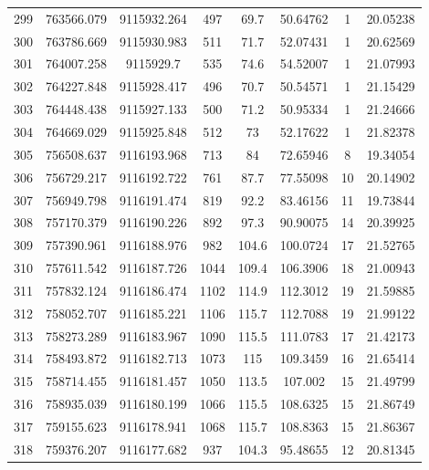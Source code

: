 \begin{longtable}{cccccccc}
299  & 763566.079      & 9115932.264      & 497     & 69.7  & 50.64762 & 1  & 20.05238 \\
300  & 763786.669      & 9115930.983      & 511     & 71.7  & 52.07431 & 1  & 20.62569 \\
301  & 764007.258      & 9115929.7        & 535     & 74.6  & 54.52007 & 1  & 21.07993 \\
302  & 764227.848      & 9115928.417      & 496     & 70.7  & 50.54571 & 1  & 21.15429 \\
303  & 764448.438      & 9115927.133      & 500     & 71.2  & 50.95334 & 1  & 21.24666 \\
304  & 764669.029      & 9115925.848      & 512     & 73    & 52.17622 & 1  & 21.82378 \\
305  & 756508.637      & 9116193.968      & 713     & 84    & 72.65946 & 8  & 19.34054 \\
306  & 756729.217      & 9116192.722      & 761     & 87.7  & 77.55098 & 10 & 20.14902 \\
307  & 756949.798      & 9116191.474      & 819     & 92.2  & 83.46156 & 11 & 19.73844 \\
308  & 757170.379      & 9116190.226      & 892     & 97.3  & 90.90075 & 14 & 20.39925 \\
309  & 757390.961      & 9116188.976      & 982     & 104.6 & 100.0724 & 17 & 21.52765 \\
310  & 757611.542      & 9116187.726      & 1044    & 109.4 & 106.3906 & 18 & 21.00943 \\
311  & 757832.124      & 9116186.474      & 1102    & 114.9 & 112.3012 & 19 & 21.59885 \\
312  & 758052.707      & 9116185.221      & 1106    & 115.7 & 112.7088 & 19 & 21.99122 \\
313  & 758273.289      & 9116183.967      & 1090    & 115.5 & 111.0783 & 17 & 21.42173 \\
314  & 758493.872      & 9116182.713      & 1073    & 115   & 109.3459 & 16 & 21.65414 \\
315  & 758714.455      & 9116181.457      & 1050    & 113.5 & 107.002  & 15 & 21.49799 \\
316  & 758935.039      & 9116180.199      & 1066    & 115.5 & 108.6325 & 15 & 21.86749 \\
317  & 759155.623      & 9116178.941      & 1068    & 115.7 & 108.8363 & 15 & 21.86367 \\
318  & 759376.207      & 9116177.682      & 937     & 104.3 & 95.48655 & 12 & 20.81345 \\

\end{longtable}
